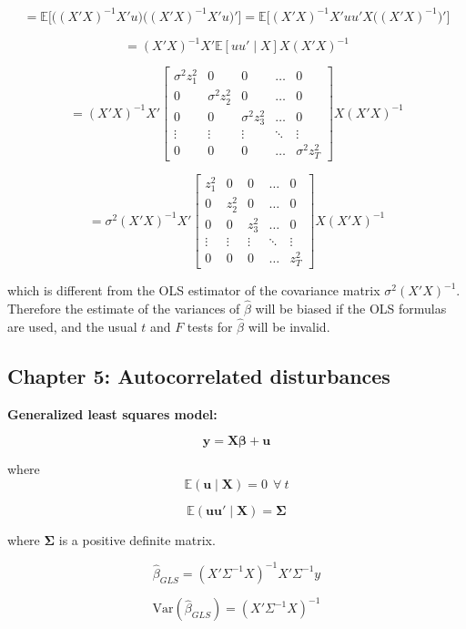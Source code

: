 \documentclass{article}
\newcommand{\E}{\mathbb{E}}
\newcommand{\Var}{\mathrm{Var}}
\begin{document}
\[
= \E \big[\big((X'X)^{-1}X'u\big)\big((X'X)^{-1}X'u \big) '\big] = \E \big[ (X'X)^{-1}X'uu'X\big((X'X)^{-1}\big)' \big]
\]

\[
= (X'X)^{-1}X' \E[uu' \mid X] X(X'X)^{-1}
\]

\[
= (X'X)^{-1}X' \begin{bmatrix}
    \sigma^2 z_1^2 &0 & 0 & \dots & 0 \\
   0 & \sigma^2 z_2^2 &0 & \dots  & 0 \\
   0 & 0 & \sigma^2 z_3^2 & \dots  & 0 \\
    \vdots & \vdots & \vdots & \ddots & \vdots \\
    0 & 0 &0 & \dots  & \sigma^2 z_T^2
\end{bmatrix}  X(X'X)^{-1}
\]

\[
= \sigma^2(X'X)^{-1}X' \begin{bmatrix}
    z_1^2 &0 & 0 & \dots & 0 \\
   0 & z_2^2 &0 & \dots  & 0 \\
   0 & 0 &  z_3^2 & \dots  & 0 \\
    \vdots & \vdots & \vdots & \ddots & \vdots \\
    0 & 0 &0 & \dots  &  z_T^2
\end{bmatrix}  X(X'X)^{-1}
\]

which is different from the OLS estimator of the covariance matrix \(\sigma^2(X'X)^{-1}\). Therefore the estimate of the variances of \(\hat{\beta}\) will be biased if the OLS formulas are used, and the usual \(t\) and \(F\) tests for \(\hat{\beta}\) will be invalid.

\subsection{Chapter 5: Autocorrelated disturbances}

\textbf{Generalized least squares model:}

\[
\boldsymbol{y} = \boldsymbol{X}\boldsymbol{\beta} + \boldsymbol{u}
\]

where
\[
\E(\boldsymbol{u} \mid \boldsymbol{X}) = 0 \ \ \forall \ t
\]

\[
\E(\boldsymbol{u} \boldsymbol{u}' \mid \boldsymbol{X}) = \boldsymbol{\Sigma} 
\]

where \(\boldsymbol{\Sigma}\) is a positive definite matrix.

\[
\hat{\beta}_{GLS} = (X' \Sigma^{-1}X)^{-1}X' \Sigma^{-1}y 
\]

\[
\Var(\hat{\beta}_{GLS}) = (X' \Sigma^{-1} X)^{-1}
\]
\end{document}

